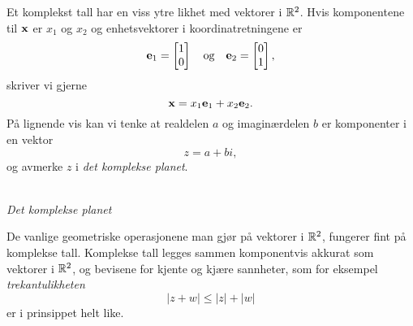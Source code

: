 Et komplekst tall har en viss ytre likhet med vektorer i $\mathbb{R}^2$. 
Hvis komponentene til $\mathbf{x}$ er $x_1$ og $x_2$ og enhetsvektorer i koordinatretningene er 
\[
\mathbf{e}_1=\begin{bmatrix} 1 \\ 0 \end{bmatrix} \quad \text{og} \quad \mathbf{e}_2=\begin{bmatrix} 0 \\ 1 \end{bmatrix}, 
\]
skriver vi gjerne
\[
\mathbf{x}=x_1 \mathbf{e}_1+x_2 \mathbf{e}_2.
\]
På lignende vis kan vi tenke at realdelen $a$ og imaginærdelen $b$ er komponenter i en vektor
\[
z=a+bi,
\] 
og avmerke $z$ i \emph{det komplekse planet}.
\begin{center}
\\
{\small \textit{Det komplekse planet}}
\end{center}
De vanlige geometriske operasjonene man gjør på vektorer i $\mathbb{R}^2$, 
fungerer fint på komplekse tall. 
Komplekse tall legges sammen komponentvis akkurat som vektorer i $\mathbb{R}^2$, 
og bevisene for kjente og kjære sannheter, som for eksempel \emph{trekantulikheten}
\[
|z+w|\leq |z| + |w|
\]
er i prinsippet helt like.


